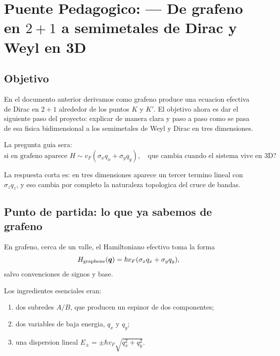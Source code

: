 \chapter{Puente Pedagogico: --- De grafeno en \(2+1\) a semimetales de Dirac y Weyl en 3D}
\label{ch:de-grafeno-a-weyl-dirac-3d}







\section{Objetivo}

En el documento anterior derivamos como grafeno produce una ecuacion efectiva de Dirac en \(2+1\) alrededor de los puntos \(K\) y \(K'\). El objetivo ahora es dar el siguiente paso del proyecto: explicar de manera clara y paso a paso como se pasa de esa fisica bidimensional a los semimetales de Weyl y Dirac en tres dimensiones.

La pregunta guia sera:
\[
\text{si en grafeno aparece }
H \sim v_F(\sigma_x q_x + \sigma_y q_y),
\quad
\text{que cambia cuando el sistema vive en 3D?}
\]

La respuesta corta es: en tres dimensiones aparece un tercer termino lineal con \(\sigma_z q_z\), y eso cambia por completo la naturaleza topologica del cruce de bandas.

\section{Punto de partida: lo que ya sabemos de grafeno}

En grafeno, cerca de un valle, el Hamiltoniano efectivo toma la forma
\begin{equation}
H_{\text{graphene}}(\bm{q})=\hbar v_F(\sigma_x q_x + \sigma_y q_y),
\label{c06:eq:graphene2d}
\end{equation}
salvo convenciones de signos y base.

Los ingredientes esenciales eran:

\begin{enumerate}[leftmargin=*]
  \item dos subredes \(A/B\), que producen un espinor de dos componentes;
  \item dos variables de baja energia, \(q_x\) y \(q_y\);
  \item una dispersion lineal
  \(
  E_\pm = \pm \hbar v_F \sqrt{q_x^2+q_y^2}.
  \)
\end{enumerate}

